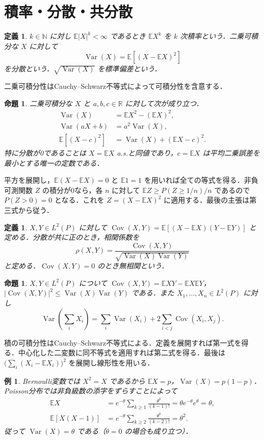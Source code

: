 \documentclass[a5paper,10pt,onecolumn]{jsarticle}
\makeatletter
\theoremstyle{mathnotetheorem}
\newtheorem{definition}[theorem]{定義}
\newtheorem{proposition}[theorem]{命題}
\newtheorem{example}[theorem]{例}
\renewcommand{\proofname}{証明}
\renewenvironment{proof}[1][\proofname]{%
  \par\pushQED{\qed}\normalfont\topsep4\p@\@plus2\p@\relax
  \trivlist\item[\hskip\labelsep\bfseries #1]\ignorespaces
}{\popQED\endtrivlist\@endpefalse}
\newcommand{\R}{\mathbb{R}}
\newcommand{\N}{\mathbb{N}}
\newcommand{\E}{\mathbb E}
\newcommand{\1}{\mathbf{1}}
\DeclareMathOperator{\Var}{Var}
\DeclareMathOperator{\Cov}{Cov}
\makeatother
\begin{document}
\section{積率・分散・共分散}
\begin{definition}
$k\in\N$ に対し $\E|X|^k<\infty$ であるとき $\E X^k$ を $k$ 次積率という．二乗可積分な $X$ に対して
\[
 \Var(X)=\E[(X-\E X)^2]
\]
を分散という．$\sqrt{\Var(X)}$ を標準偏差という．
\end{definition}
二乗可積分性はCauchy--Schwarz不等式によって可積分性を含意する．
\begin{proposition}
二乗可積分な $X$ と $a,b,c\in\R$ に対して次が成り立つ．
\begin{align*}
 \Var(X)&=\E X^2-(\E X)^2,\\
 \Var(aX+b)&=a^2\Var(X),\\
 \E[(X-c)^2]&=\Var(X)+(\E X-c)^2.
\end{align*}
特に分散が0であることは $X=\E X$ a.s.と同値であり，$c=\E X$ は平均二乗誤差を最小とする唯一の定数である．
\end{proposition}
\begin{proof}
平方を展開し，$\E(X-\E X)=0$ と $\E1=1$ を用いれば全ての等式を得る．非負可測関数 $Z$ の積分が0なら，各 $n$ に対して $\E Z\ge P(Z\ge1/n)/n$ であるので $P(Z>0)=0$ となる．これを $Z=(X-\E X)^2$ に適用する．最後の主張は第三式から従う．
\end{proof}
\begin{definition}
$X,Y\in L^2(P)$ に対して $\Cov(X,Y)=\E[(X-\E X)(Y-\E Y)]$ と定める．分散が共に正のとき，相関係数を
\[
 \rho(X,Y)=\frac{\Cov(X,Y)}{\sqrt{\Var(X)\Var(Y)}}
\]
と定める．$\Cov(X,Y)=0$ のとき無相関という．
\end{definition}
\begin{proposition}
$X,Y\in L^2(P)$ について $\Cov(X,Y)=\E XY-\E X\E Y$，$|\Cov(X,Y)|^2\le\Var(X)\Var(Y)$ である．また $X_1,\ldots,X_n\in L^2(P)$ に対し
\[
 \Var\left(\sum_iX_i\right)=\sum_i\Var(X_i)+2\sum_{i<j}\Cov(X_i,X_j).
\]
\end{proposition}
\begin{proof}
積の可積分性はCauchy--Schwarz不等式による．定義を展開すれば第一式を得る．中心化した二変数に同不等式を適用すれば第二式を得る．最後は $\bigl(\sum_i(X_i-\E X_i)\bigr)^2$ を展開し線形性を用いる．
\end{proof}
\begin{example}
Bernoulli変数では $X^2=X$ であるから $\E X=p$，$\Var(X)=p(1-p)$．Poisson分布では非負級数の添字をずらすことによって
\begin{align*}
 \E X&=e^{-\theta}\sum_{k\ge1}\frac{\theta^k}{(k-1)!}=\theta e^{-\theta}e^\theta=\theta,\\
 \E[X(X-1)]&=e^{-\theta}\sum_{k\ge2}\frac{\theta^k}{(k-2)!}=\theta^2.
\end{align*}
従って $\Var(X)=\theta$ である（$\theta=0$ の場合も成り立つ）．
\end{example}
\end{document}
